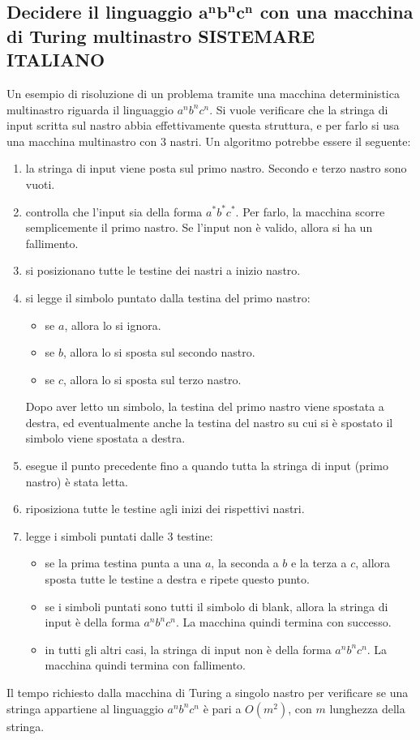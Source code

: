 \subsection{Decidere il linguaggio $\mathbf{a^nb^nc^n}$ con una macchina di Turing multinastro SISTEMARE ITALIANO}
Un esempio di risoluzione di un problema tramite una macchina deterministica multinastro riguarda il linguaggio $a^nb^nc^n$.
Si vuole verificare che la stringa di input scritta sul nastro abbia effettivamente questa struttura, e per farlo si usa una macchina multinastro con 3 nastri.
Un algoritmo potrebbe essere il seguente:
\begin{enumerate}
    \item la stringa di input viene posta sul primo nastro. Secondo e terzo nastro sono vuoti.
    \item controlla che l'input sia della forma $a^*b^*c^*$. Per farlo, la macchina scorre semplicemente il primo nastro.
    Se l'input non è valido, allora si ha un fallimento.
    \item si posizionano tutte le testine dei nastri a inizio nastro.
    \item si legge il simbolo puntato dalla testina del primo nastro:
    \begin{itemize}
        \item se $a$, allora lo si ignora.
        \item se $b$, allora lo si sposta sul secondo nastro.
        \item se $c$, allora lo si sposta sul terzo nastro.
    \end{itemize}
    Dopo aver letto un simbolo, la testina del primo nastro viene spostata a destra, ed eventualmente anche la testina del nastro su cui si è spostato il simbolo viene spostata a destra.
    \item esegue il punto precedente fino a quando tutta la stringa di input (primo nastro) è stata letta.
    \item riposiziona tutte le testine agli inizi dei rispettivi nastri.
    \item legge i simboli puntati dalle 3 testine:
    \begin{itemize}
        \item se la prima testina punta a una $a$, la seconda a $b$ e la terza a $c$, allora sposta tutte le testine a destra e ripete questo punto.
        \item se i simboli puntati sono tutti il simbolo di blank, allora la stringa di input è della forma $a^nb^nc^n$. La macchina quindi termina con successo.
        \item in tutti gli altri casi, la stringa di input non è della forma $a^nb^nc^n$. La macchina quindi termina con fallimento.
    \end{itemize}
\end{enumerate}

\begin{rem}
    Il tempo richiesto dalla macchina di Turing a singolo nastro per verificare se una stringa appartiene al linguaggio $a^nb^nc^n$ è pari a $O(m^2)$, con $m$ lunghezza della stringa.
\end{rem}
